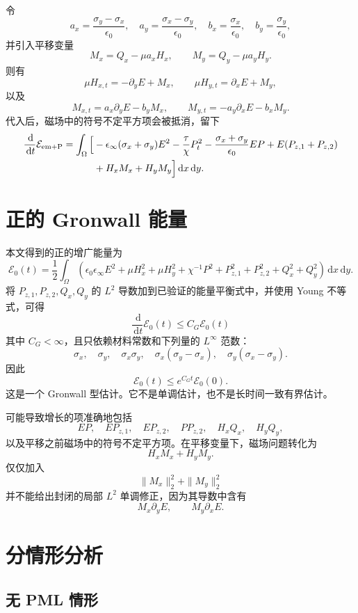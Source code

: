 \documentclass[UTF8,a4paper,12pt]{ctexart}
\newcommand{\dd}{\,\mathrm{d}}
\newcommand{\sx}{\sigma_x}
\newcommand{\sy}{\sigma_y}
\newcommand{\Ecal}{\mathcal E}
\begin{document}
令
\[
a_x=\frac{\sy-\sx}{\epsilon_0},\quad
a_y=\frac{\sx-\sy}{\epsilon_0},\quad
b_x=\frac{\sx}{\epsilon_0},\quad
b_y=\frac{\sy}{\epsilon_0},
\]
并引入平移变量
\[
M_x=Q_x-\mu a_xH_x,\qquad M_y=Q_y-\mu a_yH_y.
\]
则有
\[
\mu H_{x,t}=-\partial_yE+M_x,\qquad
\mu H_{y,t}=\partial_xE+M_y,
\]
以及
\[
M_{x,t}=a_x\partial_yE-b_yM_x,\qquad
M_{y,t}=-a_y\partial_xE-b_xM_y .
\]
代入后，磁场中的符号不定平方项会被抵消，留下
\begin{equation}
\begin{aligned}
\frac{\dd}{\dd t}\Ecal_{\rm em+P}
=\int_\Omega\Big[
&-\epsilon_\infty(\sx+\sy)E^2
-\frac{\tau}{\chi}P_t^2
-\frac{\sx+\sy}{\epsilon_0}EP
+E(P_{z,1}+P_{z,2})\\
&+H_xM_x+H_yM_y
\Big]\dd x\dd y .
\end{aligned}
\label{eq:shifted-balance}
\end{equation}

\section{正的 Gronwall 能量}

本文得到的正的增广能量为
\[
\Ecal_0(t)
=\frac12\int_\Omega
\left(
\epsilon_0\epsilon_\infty E^2+\mu H_x^2+\mu H_y^2
+\chi^{-1}P^2+P_{z,1}^2+P_{z,2}^2+Q_x^2+Q_y^2
\right)\dd x\dd y .
\]
将 \(P_{z,1},P_{z,2},Q_x,Q_y\) 的 \(L^2\) 导数加到已验证的能量平衡式中，并使用 Young 不等式，可得
\[
\boxed{
\frac{\dd}{\dd t}\Ecal_0(t)\le C_G\Ecal_0(t)
}
\]
其中 \(C_G<\infty\)，且只依赖材料常数和下列量的 \(L^\infty\) 范数：
\[
\sx,\quad \sy,\quad \sx\sy,\quad
\sx(\sy-\sx),\quad
\sy(\sx-\sy).
\]
因此
\[
\boxed{
\Ecal_0(t)\le e^{C_Gt}\Ecal_0(0).
}
\]
这是一个 Gronwall 型估计。它不是单调估计，也不是长时间一致有界估计。

可能导致增长的项准确地包括
\[
EP,\quad EP_{z,1},\quad EP_{z,2},\quad PP_{z,2},\quad H_xQ_x,\quad H_yQ_y,
\]
以及平移之前磁场中的符号不定平方项。在平移变量下，磁场问题转化为
\[
H_xM_x+H_yM_y.
\]
仅仅加入
\[
\|M_x\|_2^2+\|M_y\|_2^2
\]
并不能给出封闭的局部 \(L^2\) 单调修正，因为其导数中含有
\[
M_x\partial_yE,\qquad M_y\partial_xE.
\]

\section{分情形分析}

\subsection{无 PML 情形}
\end{document}
